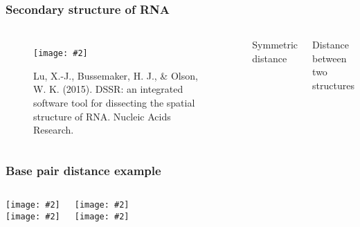 \documentclass{beamer}
\newcommand{\slidefigure}[2][1]{\centering\texttt{[image: \#2]}}
\begin{document}
\begin{frame}
  \frametitle{Secondary structure of RNA}
  \begin{columns}
    \begin{figure}
      \slidefigure{rnass} \caption{Lu, X.-J., Bussemaker, H. J., \& Olson, W. K. (2015). DSSR: an integrated software tool for dissecting the spatial structure of RNA. Nucleic Acids Research.}
    \end{figure}

    \begin{block}
      {Symmetric distance}
      \resizebox{\linewidth}{!}{
      \begin{minipage}{\linewidth}
        \begin{align*}
          \dBP{\str}{\strT} = |\str \cup \strT| - |\str \cap \strT|
        \end{align*}
      \end{minipage}
      }
    \end{block}
    \begin{block}
      {Distance between two structures}
    \end{block}
  \end{columns}
\end{frame}

\begin{frame}
  \frametitle{Base pair distance example}

  \begin{columns}[t]
    \centering
    \slidefigure[.6]{Images/bpdistex0} \\
    \slidefigure[.6]{Images/bpdistex2}

    \centering
    \slidefigure[.6]{Images/bpdistex1} \\
    \slidefigure[.6]{Images/bpdistex3}

  \end{columns}
\end{frame}
\end{document}
